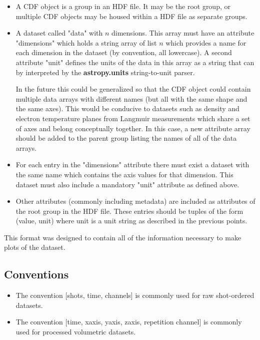 \documentclass[12pt]{article}
\newcommand{\loc}[1]{{\bf \fontfamily{pcr}\selectfont #1}}
\newcommand{\todo}[1]{ \begin{tcolorbox} \centering  #1 \end{tcolorbox}}
\begin{document}
\begin{itemize}

\item A CDF object is a group in an HDF file. It may be the root group, or multiple CDF objects may be housed within a HDF file as separate groups.

\item A dataset called "data" with $n$ dimensions. This array must have an attribute "dimensions" which holds a string array of list $n$ which provides a name for each dimension in the dataset (by convention, all lowercase). A second attribute "unit" defines the units of the data in this array as a string that can by interpreted by the \loc{astropy.units} string-to-unit parser. 

\todo{In the future this could be generalized so that the CDF object could contain multiple data arrays with different names (but all with the same shape and the same axes). This would be conducive to datasets such as density and electron temperature planes from Langmuir measurements which share a set of axes and belong conceptually together. In this case, a new attribute array should be added to the parent group listing the names of all of the data arrays. }

\item For each entry in the "dimensions" attribute there must exist a dataset with the same name which contains the axis values for that dimension. This dataset must also include a mandatory "unit" attribute as defined above.

\item Other attributes (commonly including metadata) are included as attributes of the root group in the HDF file. These entries should be tuples of the form (value, unit) where unit is a unit string as described in the previous points.

\end{itemize}

This format was designed to contain all of the information necessary to make plots of the dataset.

\subsection{Conventions}
\begin{itemize}
\item The convention [shots, time, channels] is commonly used for raw shot-ordered datasets.
\item The convention [time, xaxis, yaxis, zaxis, repetition channel] is commonly used for processed volumetric datasets. 
\end{itemize}
\end{document}
